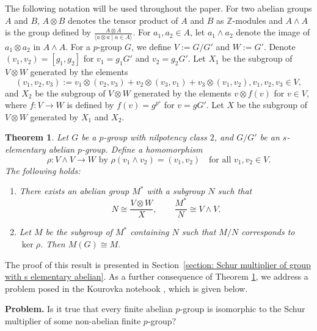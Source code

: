 \documentclass[preprint,sort&compress,12pt]{elsarticle}
\newtheorem{theorem}{Theorem}[section]
\numberwithin{equation}{section}
\theoremstyle{definition}
\begin{document}
The following notation will be used throughout the paper. For two abelian groups $A$ and $B$, $A\otimes B$ denotes the tensor product of $A$ and $B$ as $\mathbb Z$-modules and $A\wedge A$ is the group defined by $\frac{A\otimes A}{\langle a\otimes a\mid a \in A \rangle}$. For ${a_1, a_2\in A}$, let $a_1\wedge a_2$ denote the image of $a_1\otimes a_2$ in $A \wedge A$.
For a $p$-group $G$, we define ${V:=G/G'}$ and $W:=G'$.  %
Denote ${(v_1,v_2)=[g_1,g_2]}$ for ${v_1=g_1G'}$ and ${v_2=g_2G'}$. Let $X_1$ be the subgroup of ${V \otimes W}$ generated by the elements $$(v_1,v_2,v_3):=v_1 \otimes (v_2,v_3)+v_2 \otimes (v_3,v_1) + v_3 \otimes (v_1,v_2),v_1,v_2,v_3 \in V,$$ and $X_2$ be the subgroup of $V \otimes W$ generated by the elements $v \otimes f(v)$ for $v\in V$, where $f:V \to W$ is defined by  $f(v)=g^{p^s}$ for $v=gG'$. Let $X$ be the subgroup of $V \otimes W$ generated by $X_1$ and $X_2$.
\begin{theorem} \label{maintheorem Schur computation}
    Let $G$ be a $p$-group with nilpotency class $2$, and $G/G'$ be an $s$-elementary abelian $p$-group. Define a homomorphism
\[
\rho : V \wedge V \longrightarrow W
\text{ by }
\rho(v_{1} \wedge v_{2}) = (v_{1}, v_{2})
\quad \text{for all } v_{1}, v_{2} \in V.
\]
The following holds:
\begin{enumerate}
    \item There exists an abelian group $M^*$ with a subgroup $N$ such that 
    \[
    N \cong \frac{V \otimes W}{X}, \qquad
\frac{M^{*}}{N} \cong V \wedge V.
\]
    \item Let $M$ be the subgroup of $M^{*}$ containing $N$ such that $M/N$
corresponds to $\ker \rho$. Then
$M(G) \cong M.$

\end{enumerate}
\end{theorem}

The proof of this result is presented in Section~\ref{section: Schur multiplier of group with s elementary abelian}.
As a further consequence of Theorem \ref{maintheorem Schur computation}, we address a problem posed in the Kourovka notebook \cite[Problem 15.30]{Kour2018}, which is given below.

\medskip
\noindent\textbf{Problem.}
Is it true that every finite abelian \(p\)-group is isomorphic to the Schur
multiplier of some non-abelian finite \(p\)-group?
\end{document}
